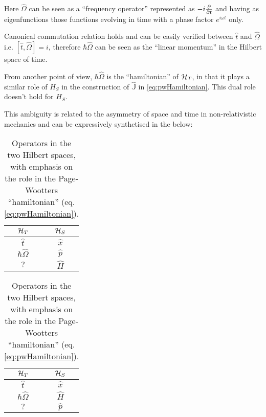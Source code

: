 Here $\hat{\Omega}$ can be seen as a ``frequency operator''
represented as $-i\pdv{t}$ and having as eigenfunctions
those functions evolving in time with a phase factor $e^{i \omega t}$ only.

Canonical commutation relation holds and can be easily verified
between $\hat{t}$ and $\hat{\Omega}$
i.e. $[\hat{t}, \hat{\Omega}] = i$,
therefore $\hbar\hat{\Omega}$ can be seen as the ``linear momentum''
in the Hilbert space of time.

From another point of view, $\hbar\hat{\Omega}$ is the ``hamiltonian'' of $\mathcal{H}_T$,
in that it plays a similar role of $H_S$ in the construction of
$\hat{\mathbb{J}}$ in \eqref{eq:pwHamiltonian}. This dual role doesn't hold
for $H_S$. 

This ambiguity is related to the asymmetry of space and time in non-relativistic
mechanics and can be expressively synthetised in the below:
{\renewcommand{\arraystretch}{1.6}
  \begin{table}[h!]
    \parbox{.45\linewidth}{
      \centering
      \begin{tabular}{c|c}
        $\mathcal{H}_T$        & $\mathcal{H}_S$  \\
        \hline
        \hline
        $\hat{t}$           & $\hat{x}$     \\
        \hline
        $\hbar\hat{\Omega}$ & $\hat{p}$     \\
        \hline
        $?$                 & $\hat{H}$
      \end{tabular}
      {\caption{
        Operators in the two Hilbert spaces,
        with emphasis on the algebraic relation
        to other operators in the same space.
      }\label{op_comparison_alg}}
    }
    \hfill
    \parbox{.45\linewidth}{
      \centering
      \begin{tabular}{c|c}
        $\mathcal{H}_T$        & $\mathcal{H}_S$  \\
        \hline
        \hline
        $\hat{t}$           & $\hat{x}$     \\
        \hline
        $\hbar\hat{\Omega}$ & $\hat{H}$     \\
        \hline
        $?$                 & $\hat{p}$
      \end{tabular}
      {\caption{
        Operators in the two Hilbert spaces,
        with emphasis on the role in the
        Page-Wootters ``hamiltonian'' (eq. \ref{eq:pwHamiltonian}).
      }\label{op_comparison_J}}
    }
  \end{table}
}

